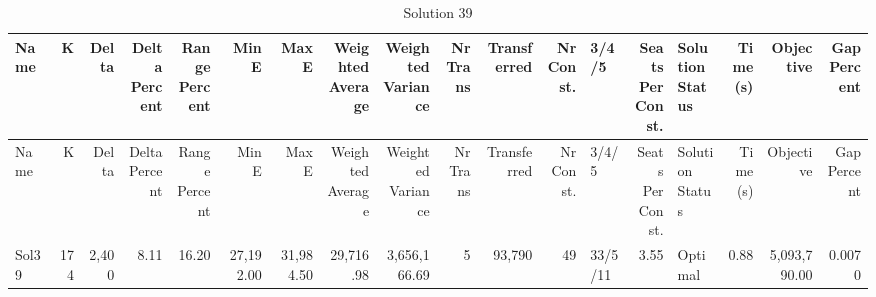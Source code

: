 \documentclass[a4paper]{article}
\begin{document}
{\scriptsize
\begin{longtable}{lrrrrrrrrrrrlrlrrr}
\caption{Solution 39}
\\ \toprule
Name &K &Delta &\shortstack{Delta\\Percent} &\shortstack{Range\\Percent} &Min E &Max E &\shortstack{Weighted\\Average} &\shortstack{Weighted\\Variance} &\shortstack{Nr\\Trans} &Transferred &\shortstack{Nr\\Const.} &3/4/5 &\shortstack{Seats\\Per\\Const.} &\shortstack{Solution\\Status} &\shortstack{Time\\(s)} &Objective &\shortstack{Gap\\Percent} \\ \midrule
\endfirsthead
\toprule
Name &K &Delta &\shortstack{Delta\\Percent} &\shortstack{Range\\Percent} &Min E &Max E &\shortstack{Weighted\\Average} &\shortstack{Weighted\\Variance} &\shortstack{Nr\\Trans} &Transferred &\shortstack{Nr\\Const.} &3/4/5 &\shortstack{Seats\\Per\\Const.} &\shortstack{Solution\\Status} &\shortstack{Time\\(s)} &Objective &\shortstack{Gap\\Percent} \\ \midrule
\endhead
\bottomrule
\endfoot
Sol39&174&2,400& 8.11&16.20&27,192.00&31,984.50&29,716.98&3,656,166.69&5&93,790&49&33/5/11& 3.55&Optimal& 0.88&5,093,790.00&0.0070\\ 
\end{longtable}

}
\end{document}

